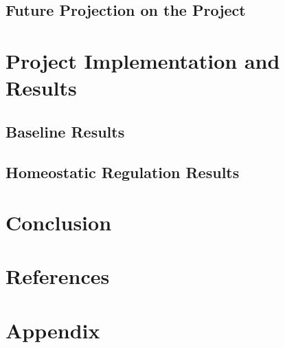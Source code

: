 \documentclass[letterpaper,12pt]{article}
\begin{document}
\subsection{Future Projection on the Project}

\section{Project Implementation and Results}
\subsection{Baseline Results}
\subsection{Homeostatic Regulation Results}

\section{Conclusion}
\section{References}


\section{Appendix}
\end{document}
